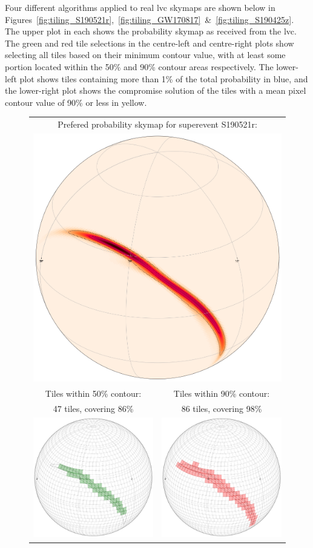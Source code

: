 \begin{colsection}
\begin{colsection}
Four different algorithms applied to real \gls{lvc} skymaps are shown below in Figures~\ref{fig:tiling_S190521r},~\ref{fig:tiling_GW170817}~\&~\ref{fig:tiling_S190425z}. The upper plot in each shows the probability skymap as received from the \gls{lvc}. The green and red tile selections in the centre-left and centre-right plots show selecting all tiles based on their minimum contour value, with at least some portion located within the 50\% and 90\% contour areas respectively. The lower-left plot shows tiles containing more than 1\% of the total probability in blue, and the lower-right plot shows the compromise solution of the tiles with a mean pixel contour value of 90\% or less in yellow.


\begin{figure}[p]
\begin{center}
\begin{tabular}{cc}
\multicolumn{2}{c}{Prefered probability skymap for superevent S190521r:}
\\
\multicolumn{2}{c}{\includegraphics[width=0.5\linewidth]{images/tiling/1_0.png}}
\\
Tiles within 50\% contour: &
Tiles within 90\% contour:
\\
47 tiles, covering 86\% &
86 tiles, covering 98\%
\\
\includegraphics[width=0.25\linewidth]{images/tiling/1_c.png} &
\includegraphics[width=0.25\linewidth]{images/tiling/1_d.png}

\end{tabular}
\end{center}
\end{figure}
\end{colsection}
\end{colsection}

